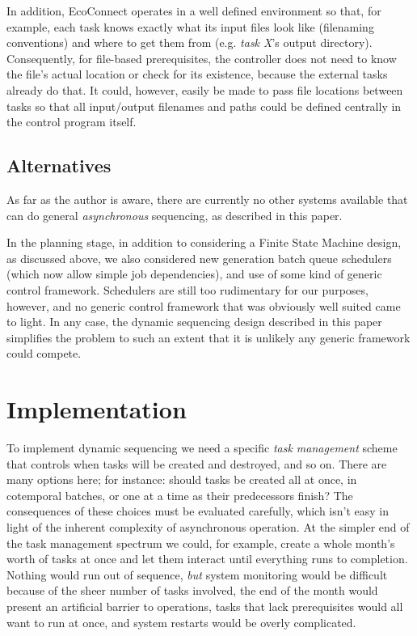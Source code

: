 \documentclass[11pt,a4paper]{article}
\begin{document}
In addition, EcoConnect operates in a well defined environment so that,
for example, each task knows exactly what its input files look like
(filenaming conventions) and where to get them from (e.g. {\em task X}'s
output directory). Consequently, for file-based prerequisites, the
controller does not need to know the file's actual location or check for
its existence, because the external tasks already do that. It could,
however, easily be made to pass file locations between tasks so that all
input/output filenames and paths could be defined centrally in the
control program itself.  


\subsection{Alternatives}

As far as the author is aware, there are currently no other systems
available that can do general {\em asynchronous} sequencing, as
described in this paper.

In the planning stage, in addition to considering a Finite State Machine
design, as discussed above, we also considered new generation batch
queue schedulers (which now allow simple job dependencies), and use of
some kind of generic control framework.  Schedulers are still too
rudimentary for our purposes, however, and no generic control framework
that was obviously well suited came to light. In any case, the dynamic
sequencing design described in this paper simplifies the problem to such
an extent that it is unlikely any generic framework could compete.  


\section{Implementation}

To implement dynamic sequencing we need a specific {\em task management}
scheme that controls when tasks will be created and destroyed, and so
on. There are many options here; for instance: should tasks be created
all at once, in cotemporal batches, or one at a time as their
predecessors finish? The consequences of these choices must be evaluated
carefully, which isn't easy in light of the inherent complexity of
asynchronous operation. At the simpler end of the task management
spectrum we could, for example, create a whole month's worth of tasks at
once and let them interact until everything runs to completion.  Nothing
would run out of sequence, {\em but} system monitoring would be
difficult because of the sheer number of tasks involved, the end of the
month would present an artificial barrier to operations, tasks that lack
prerequisites would all want to run at once, and system restarts would
be overly complicated. 
\end{document}
